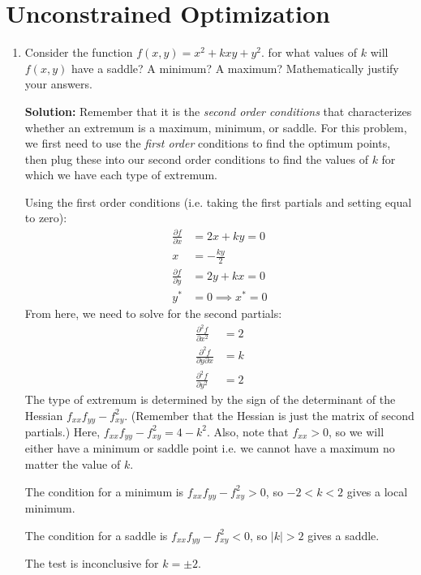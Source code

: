 \documentclass[letterpaper, 11pt]{article}
\begin{document}
\section{Unconstrained Optimization}
\begin{enumerate}
\item Consider the function $f(x,y) = x^2 + kxy + y^2$. for what values of $k$ will $f(x,y)$ have a saddle? A minimum? A maximum? Mathematically justify your answers. 
\par \textbf{Solution:} Remember that it is the \textit{second order conditions} that characterizes whether an extremum is a maximum, minimum, or saddle. For this problem, we first need to use the \textit{first order} conditions to find the optimum points, then plug these into our second order conditions to find the values of $k$ for which we have each type of extremum.
\par Using the first order conditions (i.e. taking the first partials and setting equal to zero):
\begin{align*}
\frac{ \partial f}{\partial x} &= 2x + ky = 0\\
x &= - \frac{ky}{2} \\
\frac{ \partial f}{ \partial y} &= 2y + kx = 0\\
y^* &= 0 \implies x^* = 0 
\end{align*}
From here, we need to solve for the second partials:
\begin{align*}
\frac{ \partial^2 f}{\partial x^2} &= 2 \\
\frac{ \partial^2 f}{ \partial y \partial x} &= k \\
\frac{ \partial^2 f}{\partial y^2} &= 2 
\end{align*}
The type of extremum is determined by the sign of the determinant of the Hessian $f_{xx} f_{yy} - f_{xy}^2$. (Remember that the Hessian is just the matrix of second partials.) Here, $f_{xx} f_{yy} - f_{xy}^2 = 4 - k^2$. Also, note that $ f_{xx} > 0$, so we will either have a minimum or saddle point i.e. we cannot have a maximum no matter the value of $k$. 
\par The condition for a minimum is $f_{xx} f_{yy} - f_{xy}^2 > 0$, so $-2 < k < 2$ gives a local minimum.
\par The condition for a saddle is $f_{xx} f_{yy} - f_{xy}^2 < 0$, so $|k| > 2$ gives a saddle. 
\par The test is inconclusive for $k = \pm 2$. 



\end{enumerate}
\end{document}

